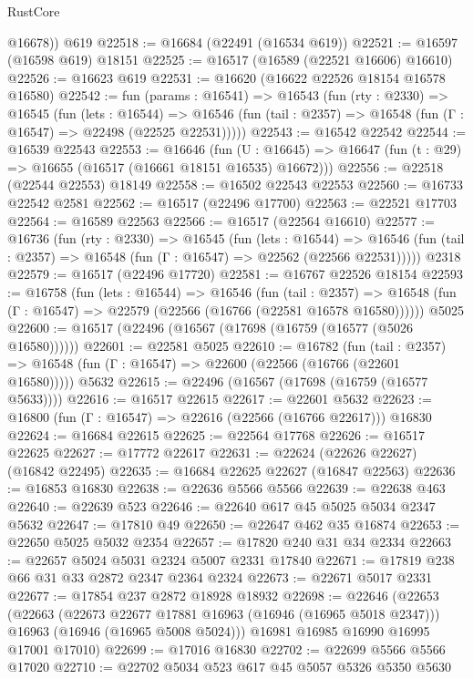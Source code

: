 \begin{lexlean}{RustCore}
\begin{coremodule}
        @16678))
    @619
@22518 := @16684 (@22491 (@16534 @619))
@22521 := @16597 (@16598 @619) @18151
@22525 := @16517 (@16589 (@22521 @16606) @16610)
@22526 := @16623 @619
@22531 := @16620 (@16622 @22526 @18154 @16578 @16580)
@22542 := fun (params : @16541) =>
  @16543
    (fun (rty : @2330) =>
    @16545
      (fun (lets : @16544) =>
      @16546 (fun (tail : @2357) => @16548 (fun (Γ : @16547) => @22498 (@22525 @22531)))))
@22543 := @16542 @22542
@22544 := @16539 @22543
@22553 := @16646
    (fun (U : @16645) => @16647 (fun (t : @29) => @16655 (@16517 (@16661 @18151 @16535) @16672)))
@22556 := @22518 (@22544 @22553) @18149
@22558 := @16502 @22543 @22553
@22560 := @16733 @22542 @2581
@22562 := @16517 (@22496 @17700)
@22563 := @22521 @17703
@22564 := @16589 @22563
@22566 := @16517 (@22564 @16610)
@22577 := @16736
    (fun (rty : @2330) =>
    @16545
      (fun (lets : @16544) =>
      @16546 (fun (tail : @2357) => @16548 (fun (Γ : @16547) => @22562 (@22566 @22531)))))
    @2318
@22579 := @16517 (@22496 @17720)
@22581 := @16767 @22526 @18154
@22593 := @16758
    (fun (lets : @16544) =>
    @16546
      (fun (tail : @2357) =>
      @16548 (fun (Γ : @16547) => @22579 (@22566 (@16766 (@22581 @16578 @16580))))))
    @5025
@22600 := @16517 (@22496 (@16567 (@17698 (@16759 (@16577 (@5026 @16580))))))
@22601 := @22581 @5025
@22610 := @16782
    (fun (tail : @2357) => @16548 (fun (Γ : @16547) => @22600 (@22566 (@16766 (@22601 @16580)))))
    @5632
@22615 := @22496 (@16567 (@17698 (@16759 (@16577 @5633))))
@22616 := @16517 @22615
@22617 := @22601 @5632
@22623 := @16800 (fun (Γ : @16547) => @22616 (@22566 (@16766 @22617))) @16830
@22624 := @16684 @22615
@22625 := @22564 @17768
@22626 := @16517 @22625
@22627 := @17772 @22617
@22631 := @22624 (@22626 @22627) (@16842 @22495)
@22635 := @16684 @22625 @22627 (@16847 @22563)
@22636 := @16853 @16830
@22638 := @22636 @5566 @5566
@22639 := @22638 @463
@22640 := @22639 @523
@22646 := @22640 @617 @45 @5025 @5034 @2347 @5632
@22647 := @17810 @49
@22650 := @22647 @462 @35 @16874
@22653 := @22650 @5025 @5032 @2354
@22657 := @17820 @240 @31 @34 @2334
@22663 := @22657 @5024 @5031 @2324 @5007 @2331 @17840
@22671 := @17819 @238 @66 @31 @33 @2872 @2347 @2364 @2324
@22673 := @22671 @5017 @2331
@22677 := @17854 @237 @2872 @18928 @18932
@22698 := @22646
    (@22653
      (@22663
        (@22673 @22677 @17881 @16963 (@16946 (@16965 @5018 @2347)))
        @16963
        (@16946 (@16965 @5008 @5024)))
      @16981
      @16985
      @16990
      @16995
      @17001
      @17010)
@22699 := @17016 @16830
@22702 := @22699 @5566 @5566 @17020
@22710 := @22702 @5034 @523 @617 @45 @5057 @5326 @5350 @5630

\end{coremodule}
\end{lexlean}
